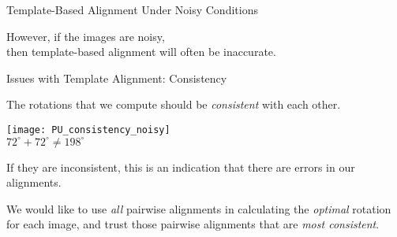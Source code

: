 \begin{frame}{Template-Based Alignment Under Noisy Conditions}

	\centering
	However, if the images are noisy, 
	\\then template-based alignment will often be inaccurate.

	
\end{frame}

\begin{frame}{Issues with Template Alignment: Consistency}

	The rotations that we compute should be {\em consistent} with each other. 
	
	\centering
	\texttt{[image: PU\_consistency\_noisy]}\\
	{\scriptsize $72^{\circ} + 72 ^{\circ} \neq 198^{\circ}$}

If they are inconsistent, this is an indication that there are errors in our alignments.
	
	We would like to use {\em all} pairwise alignments in calculating the {\em optimal} rotation for each image, and trust those pairwise alignments that are {\em most consistent}.
	
\end{frame}

